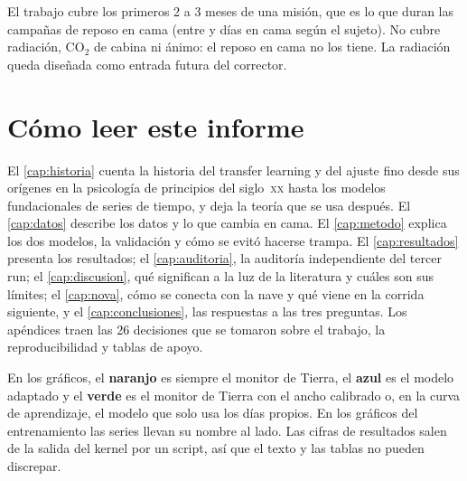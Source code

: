 El trabajo cubre los primeros 2 a 3 meses de una misión, que es lo que duran las campañas de reposo en cama (entre
 y  días en cama según el sujeto). No cubre radiación, CO$_2$ de
cabina ni ánimo: el reposo en cama no los tiene. La radiación queda diseñada como entrada futura del corrector.

\section{Cómo leer este informe}

El \cref{cap:historia} cuenta la historia del transfer learning y del ajuste fino desde sus orígenes en la psicología de
principios del siglo~\textsc{xx} hasta los modelos fundacionales de series de tiempo, y deja la teoría que se usa
después. El \cref{cap:datos} describe los datos y lo que cambia en cama. El \cref{cap:metodo} explica los dos modelos, la
validación y cómo se evitó hacerse trampa. El \cref{cap:resultados} presenta los resultados; el \cref{cap:auditoria}, la
auditoría independiente del tercer run; el \cref{cap:discusion}, qué significan a la luz de la literatura y cuáles son
sus límites; el \cref{cap:nova}, cómo se conecta con la nave y qué viene en la corrida siguiente, y el
\cref{cap:conclusiones}, las respuestas a las tres preguntas. Los apéndices traen las 26 decisiones que se tomaron
sobre el trabajo, la reproducibilidad y tablas de apoyo.

\begin{clave}
En los gráficos, el \textcolor{serieB}{\textbf{naranjo}} es siempre el monitor de Tierra, el
\textcolor{serieA}{\textbf{azul}} es el modelo adaptado y el \textcolor{serieC!80!black}{\textbf{verde}} es el monitor
de Tierra con el ancho calibrado o, en la curva de aprendizaje, el modelo que solo usa los días propios. En los
gráficos del entrenamiento las series llevan su nombre al lado. Las cifras de resultados salen de la salida del kernel
por un script, así que el texto y las tablas no pueden discrepar.
\end{clave}
